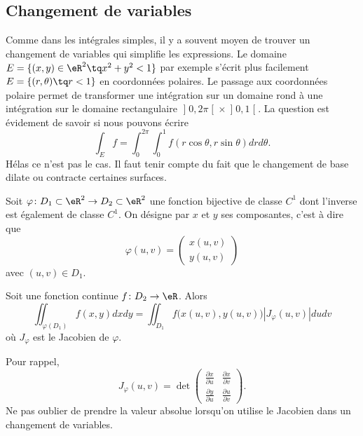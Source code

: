 \subsection{Changement de variables}

Comme dans les intégrales simples, il y a souvent moyen de trouver un changement de variables qui simplifie les expressions.  Le domaine $E=\{ (x,y)\in\eR^2\tq x^2+y^2<1 \}$ par exemple s'écrit plus facilement $E=\{ (r,\theta)\tq r<1 \}$ en coordonnées polaires. Le passage aux coordonnées polaire permet de transformer une intégration sur un domaine rond à une intégration sur le domaine rectangulaire $\mathopen]0,2\pi\mathclose[\times\mathopen]0,1\mathclose[$. La question est évidement de savoir si nous pouvons écrire
\begin{equation}
	\int_Ef=\int_{0}^{2\pi}\int_0^1f(r\cos\theta,r\sin\theta)drd\theta.
\end{equation}
Hélas ce n'est pas le cas. Il faut tenir compte du fait que le changement de base dilate ou contracte certaines surfaces.

Soit $\varphi\colon D_1\subset\eR^2\to D_2\subset \eR^2$ une fonction bijective de classe $C^1$ dont l'inverse est également de classe $C^1$. On désigne par $x$ et $y$ ses composantes, c'est à dire que
\begin{equation}
    \varphi(u,v)=\begin{pmatrix}
        x(u,v)    \\ 
        y(u,v)    
    \end{pmatrix}
\end{equation}
avec $(u,v)\in D_1$.

\begin{theorem}     \label{ThoChamDeVarIntDDf}
    Soit une fonction continue $f\colon D_2\to \eR$. Alors
    \begin{equation}
        \iint_{\varphi(D_1)}f(x,y)dxdy=\iint_{D_1}f\big( x(u,v),y(u,v) \big)| J_{\varphi}(u,v) |dudv
    \end{equation}
    où $J_{\varphi}$ est le Jacobien de $\varphi$.
\end{theorem}
Pour rappel,
\begin{equation}
    J_{\varphi}(u,v)=\det\begin{pmatrix}
        \frac{ \partial x }{ \partial u }    &   \frac{ \partial x }{ \partial v }    \\ 
        \frac{ \partial y }{ \partial u }    &   \frac{ \partial u }{ \partial v }    
    \end{pmatrix}.
\end{equation}
Ne pas oublier de prendre la valeur absolue lorsqu'on utilise le Jacobien dans un changement de variables.

